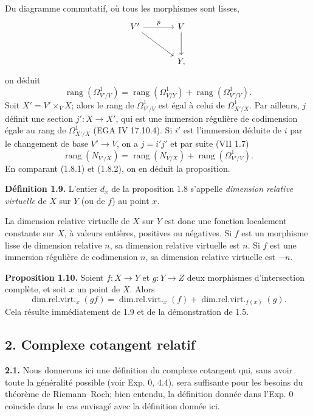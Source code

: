 \documentclass[11pt]{article}
\begin{document}
Du diagramme commutatif, où tous les morphismes sont lisses,
\[
\begin{tikzcd}[column sep=large,row sep=large]
V' \arrow[r,"p"] \arrow[dr] & V \arrow[d]\\
& Y,
\end{tikzcd}
\]
on déduit
\begin{equation}\tag{1.8.1}
\operatorname{rang}(\Omega^1_{V'/Y})=
\operatorname{rang}(\Omega^1_{V/Y})+
\operatorname{rang}(\Omega^1_{V'/V}).
\end{equation}
Soit $X'=V'\times_V X$; alors le rang de $\Omega^1_{V'/V}$ est égal à celui de $\Omega^1_{X'/X}$. Par ailleurs, $j$ définit une section $j':X\to X'$, qui est une immersion régulière de codimension égale au rang de $\Omega^1_{X'/X}$ (EGA IV 17.10.4). Si $i'$ est l'immersion déduite de $i$ par le changement de base $V'\to V$, on a $j=i'j'$ et par suite (VII 1.7)
\begin{equation}\tag{1.8.2}
\operatorname{rang}(N_{V'/X})=
\operatorname{rang}(N_{V/X})+
\operatorname{rang}(\Omega^1_{V'/V}).
\end{equation}
En comparant (1.8.1) et (1.8.2), on en déduit la proposition.

\textbf{Définition 1.9.} L'entier $d_x$ de la proposition 1.8 s'appelle \emph{dimension relative virtuelle} de $X$ sur $Y$ (ou de $f$) au point $x$.

La dimension relative virtuelle de $X$ sur $Y$ est donc une fonction localement constante sur $X$, à valeurs entières, positives ou négatives. Si $f$ est un morphisme lisse de dimension relative $n$, sa dimension relative virtuelle est $n$. Si $f$ est une immersion régulière de codimension $n$, sa dimension relative virtuelle est $-n$.

\textbf{Proposition 1.10.} Soient $f:X\to Y$ et $g:Y\to Z$ deux morphismes d'intersection complète, et soit $x$ un point de $X$. Alors
\[
\operatorname{dim.rel.virt.}_x(gf)=
\operatorname{dim.rel.virt.}_x(f)+
\operatorname{dim.rel.virt.}_{f(x)}(g).
\]
Cela résulte immédiatement de 1.9 et de la démonstration de 1.5.

\subsection*{2. Complexe cotangent relatif}

\textbf{2.1.} Nous donnerons ici une définition du complexe cotangent qui, sans avoir toute la généralité possible (voir Exp. 0, 4.4), sera suffisante pour les besoins du théorème de Riemann--Roch; bien entendu, la définition donnée dans l'Exp. 0 coïncide dans le cas envisagé avec la définition donnée ici.
\end{document}
